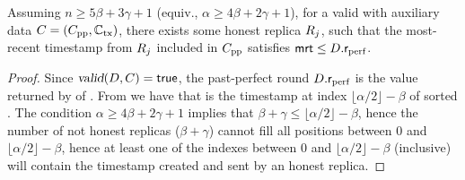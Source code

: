 \begin{lemma}\label{lem:rperf-value-of-honest}
	Assuming $n \geq 5 \beta + 3 \gamma + 1$ (equiv., $\alpha \geq 4\beta + 2 \gamma + 1$),
	for a valid \Pod with auxiliary data $C = (C_\text{pp}, \mathbb{C}_\text{tx})$,
	there exists some honest replica $R_j$, such that the most-recent timestamp \mrt from $R_j$ included in $C_\text{pp}$ satisfies $\textsf{mrt} \leq D.\textsf{r}_\text{perf}$.
\end{lemma}
\begin{proof}
	Since $\textsl{valid}(D, C) = \mathsf{true}$, the past-perfect round $D.\textsf{r}_\text{perf}$ is the value returned by \opMinPossibleTsForNewTx{} of .
	From  we have that \rperf is the timestamp at index $\lfloor \alpha / 2 \rfloor - \beta$ of sorted \mrt.
	The condition $\alpha \geq 4\beta + 2 \gamma + 1$ implies that $\beta + \gamma \leq \lfloor \alpha / 2 \rfloor - \beta$,
	hence the number of not honest replicas ($\beta + \gamma$) cannot fill all positions between $0$ and $\lfloor \alpha / 2 \rfloor - \beta$,
	hence at least one of the indexes between $0$ and $\lfloor \alpha / 2 \rfloor - \beta$ (inclusive) will
	contain the timestamp created and sent by an honest replica.
\end{proof}
